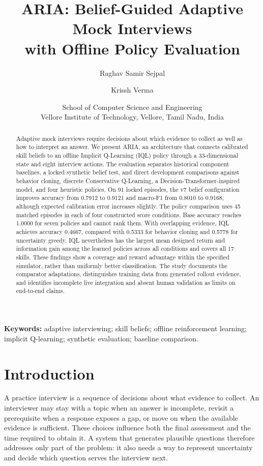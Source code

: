 \documentclass[10pt,a4paper]{article}
\title{\textbf{ARIA: Belief-Guided Adaptive Mock Interviews\\with Offline Policy Evaluation}}
\author{Raghav Samir Sejpal \and Krissh Verma}
\date{School of Computer Science and Engineering\\Vellore Institute of Technology, Vellore, Tamil Nadu, India}
\begin{document}
\maketitle
\begin{abstract}
Adaptive mock interviews require decisions about which evidence to collect as well as how to interpret an answer. We present ARIA, an architecture that connects calibrated skill beliefs to an offline Implicit Q-Learning (IQL) policy through a 33-dimensional state and eight interview actions. The evaluation separates historical component baselines, a locked synthetic belief test, and direct development comparisons against behavior cloning, discrete Conservative Q-Learning, a Decision-Transformer-inspired model, and four heuristic policies. On 91 locked episodes, the v7 belief configuration improves accuracy from 0.7912 to 0.9121 and macro-F1 from 0.8010 to 0.9168, although expected calibration error increases slightly. The policy comparison uses 45 matched episodes in each of four constructed score conditions. Base accuracy reaches 1.0000 for seven policies and cannot rank them. With overlapping evidence, IQL achieves accuracy 0.4667, compared with 0.5333 for behavior cloning and 0.5778 for uncertainty greedy. IQL nevertheless has the largest mean designed return and information gain among the learned policies across all conditions and covers all 17 skills. These findings show a coverage and reward advantage within the specified simulator, rather than uniformly better classification. The study documents the comparator adaptations, distinguishes training data from generated rollout evidence, and identifies incomplete live integration and absent human validation as limits on end-to-end claims.
\end{abstract}
\noindent\textbf{Keywords:} adaptive interviewing; skill beliefs; offline reinforcement learning; implicit Q-learning; synthetic evaluation; baseline comparison.

\section{Introduction}
A practice interview is a sequence of decisions about what evidence to collect. An interviewer may stay with a topic when an answer is incomplete, revisit a prerequisite when a response exposes a gap, or move on when the available evidence is sufficient. These choices influence both the final assessment and the time required to obtain it. A system that generates plausible questions therefore addresses only part of the problem: it also needs a way to represent uncertainty and decide which question serves the interview next.
\end{document}
